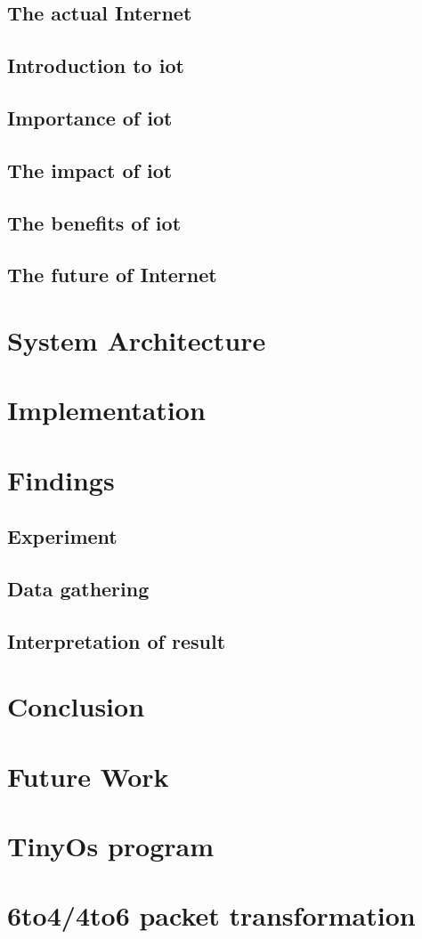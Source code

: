 \documentclass[oneside,12pt,a4paper,final]{book}
\begin{document}
\section{The actual Internet}
\section{Introduction to \gls{iot}}
\section{Importance of \gls{iot}}
\section{The impact of \gls{iot}}
\section{The benefits of \gls{iot}}
\section{The future of Internet}


\chapter{System Architecture}

\chapter{Implementation}


\chapter{Findings}
\section{Experiment}
\section{Data gathering}
\section{Interpretation of result}

\chapter{Conclusion}

\chapter{Future Work}

\appendix
\chapter{TinyOs program}
\chapter{6to4/4to6 packet transformation}

\backmatter

\singlespacing
\printglossaries
 

\end{document}
